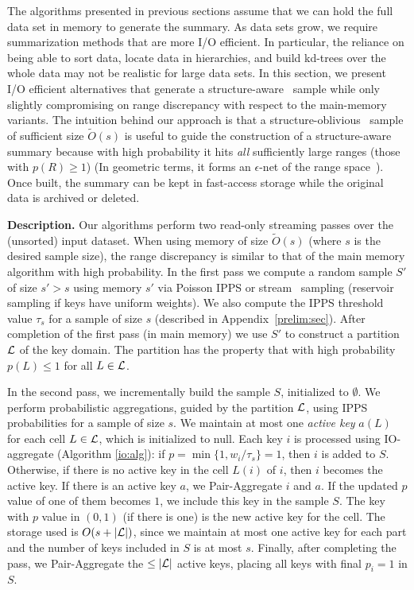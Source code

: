 \documentclass[11pt]{article}
\begin{document}
The algorithms presented in previous sections
assume that we can hold the full data set in memory to generate the
summary. 
As data sets grow,
we require summarization methods that are more I/O efficient. 
In particular, the reliance on being able to sort data, locate data in
hierarchies, and build kd-trees over the whole data may not be realistic for large data
sets. 
In this section, 
we present I/O efficient alternatives that generate a structure-aware
\varopt\ sample
while only slightly compromising on range discrepancy with respect to the
main-memory variants. 
The intuition behind our approach is that a structure-oblivious
\varopt\ sample of sufficient size $\tilde{O}(s)$ 
is useful to guide the construction of a structure-aware summary because with high probability it hits
{\em all} sufficiently large ranges (those with $p(R)\geq 1$)
(In geometric terms, it forms an 
$\epsilon$-net of the range space~\cite{epsilonnets:1987}).  
Once built, the summary can be kept in fast-access storage while the
original data is archived or deleted.

\medskip
\noindent
{\bf Description.}
Our algorithms perform two read-only streaming 
passes over the (unsorted) input dataset.
When using memory of size $\tilde{O}(s)$ (where $s$ is the desired
sample size), the range discrepancy is similar to that of the main
memory algorithm with high probability.
In the first pass we compute a random sample $S'$ of size $s' >
s$ using memory $s'$ via Poisson IPPS or stream
\varopt\ sampling (reservoir sampling if keys have uniform weights). 
We also compute the IPPS threshold value $\tau_s$ for a sample of size $s$
(described in Appendix~\ref{prelim:sec}).
After completion of the first pass (in main memory) we use $S'$
to construct a partition $\mathcal{L}$ of the key domain.  
The partition has the property that with high probability
$p(L)\leq 1$ for all $L\in\mathcal{L}$.

In the second pass, we incrementally 
build the sample $S$, initialized to $\emptyset$. 
We 
perform probabilistic aggregations, guided by the partition $\mathcal{L}$,
using IPPS probabilities for a sample of size $s$. 
We maintain at most one {\em active key} $a(L)$ for each cell $L\in\mathcal{L}$, which is initialized to null.
Each key $i$ is processed using {\sc IO-aggregate} (Algorithm \ref{io:alg}): if $p=\min\{1,w_i/\tau_s\}=1$, then $i$ is added to $S$. Otherwise,
if there is no active key in the cell $L(i)$ of
$i$, then $i$ becomes the active key.  
If there is an active key $a$, we {\sc Pair-Aggregate} $i$ and $a$. 
If the updated $p$ value of one of them becomes $1$, we include this
key in the sample $S$.  
The key with $p$ value in $(0,1)$ (if there is one) is the new active
key for the cell. 
The storage used is $O(s+|\mathcal{L}|)$, since we maintain at most one active
key for each part and the number of keys included in $S$ is at most
$s$.
Finally, after completing the pass, we {\sc Pair-Aggregate}
the $\leq |\mathcal{L}|$ active keys, placing all keys with final $p_i=1$ in $S$.
\end{document}
